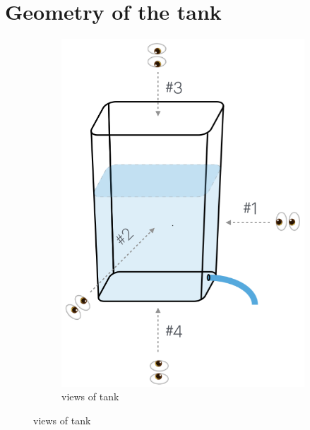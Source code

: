 \documentclass[a4paper,fleqn]{cas-sc}
\begin{document}
\newpage 

\section{Geometry of the tank}
\begin{figure}[h!]
	\centering
	 \begin{subfigure}[b]{0.35\textwidth}
		\includegraphics[width=\textwidth]{../drawings_and_photos/views.png} \caption{views of tank}
	\end{subfigure}
	

\end{figure}
\end{document}
